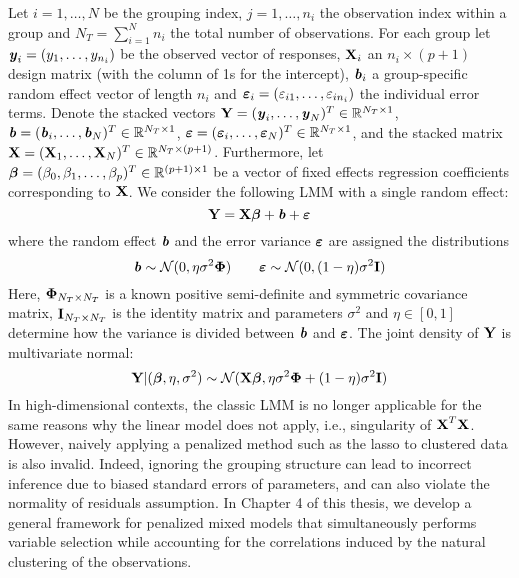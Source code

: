 Let $i = 1, \ldots, N$ be the grouping index, $j = 1, \ldots, n_i$ the observation index within a group and $N_T = \sum_{i=1}^{N} n_i$ the total number of observations. For each group let \mbox{$\textbf{\emph{y}}_i = (y_1, \ldots, y_{n_i})$} be the observed vector of responses, $\textbf{X}_i$ an $n_i \times (p + 1)$ design matrix (with the column of 1s for the intercept), $\textbf{\emph{b}}_i$ a group-specific random effect vector of length $n_i$ and \mbox{$\boldsymbol{\varepsilon}_i = (\varepsilon_{i1}, \ldots, \varepsilon_{in_i})$} the individual error terms. Denote the stacked vectors \mbox{$\textbf{Y} = (\textbf{\emph{y}}_i, \ldots, \textbf{\emph{y}}_N)^T \in \mathbb{R}^{N_T \times 1}$}, $\textbf{\emph{b}} = (\textbf{\emph{b}}_i, \ldots, \textbf{\emph{b}}_N)^T \in \mathbb{R}^{N_T \times 1}$, \mbox{$\boldsymbol{\varepsilon} = (\boldsymbol{\varepsilon}_i, \ldots, \boldsymbol{\varepsilon}_N)^T \in \mathbb{R}^{N_T \times 1}$}, and the stacked matrix \\\mbox{$\textbf{X} = (\textbf{X}_1, \ldots, \textbf{X}_N)^T \in \mathbb{R}^{N_T \times (p + 1)}$}. Furthermore, let $\boldsymbol{\beta} = (\beta_0,\beta_1, \ldots, \beta_p)^T \in \mathbb{R}^{(p+1) \times 1}$ be a vector of fixed effects regression coefficients corresponding to $\textbf{X}$. We consider the following LMM with a single random effect:
\begin{equation}
\textbf{Y} = \textbf{X} \boldsymbol{\beta} + \textbf{\emph{b}} + \boldsymbol{\varepsilon}
\end{equation}
where the random effect $\textbf{\emph{b}}$ and the error variance $\boldsymbol{\varepsilon}$ are assigned the distributions
\begin{equation}
\textbf{\emph{b}} \sim \mathcal{N}(0, \eta \sigma^2 \boldsymbol{\Phi}) \qquad \boldsymbol{\varepsilon} \sim \mathcal{N}(0, (1-\eta)\sigma^2 \textbf{I})
\end{equation}
Here, $\boldsymbol{\Phi}_{N_T \times N_T}$ is a known positive semi-definite and symmetric covariance matrix, $\textbf{I}_{N_T \times N_T}$ is the identity matrix and parameters $\sigma^2$ and $\eta \in [0,1]$ determine how the variance is divided between $\textbf{\emph{b}}$ and $\boldsymbol{\varepsilon}$. The joint density of $\textbf{Y}$ is multivariate normal:
\begin{equation}
\textbf{Y} | (\boldsymbol{\beta}, \eta, \sigma^2) \sim \mathcal{N}(\textbf{X} \boldsymbol{\beta}, \eta \sigma^2 \boldsymbol{\Phi} + (1-\eta)\sigma^2 \textbf{I}) \label{eq:prinen}
\end{equation}
In high-dimensional contexts, the classic LMM is no longer applicable for the same reasons why the linear model does not apply, i.e., singularity of $\textbf{X}^T \textbf{X}$. However, naively applying a penalized method such as the lasso to clustered data is also invalid. Indeed, ignoring the grouping structure can lead to incorrect inference due to biased standard errors of parameters, and can also violate the normality of residuals assumption. In Chapter 4 of this thesis, we develop a general framework for penalized mixed models that simultaneously performs variable selection while accounting for the correlations induced by the natural clustering of the observations. 


